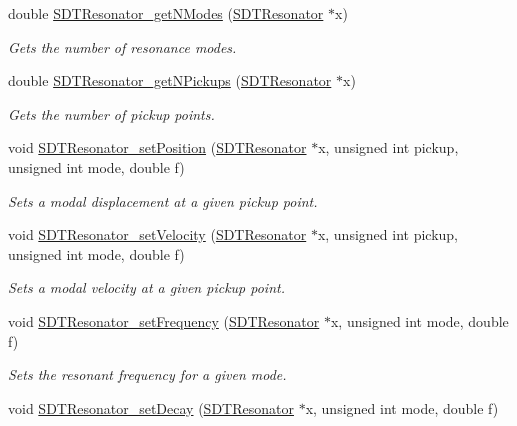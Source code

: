 \begin{DoxyCompactItemize}
double \hyperlink{group__resonators_gaf67b81e1a9672e525deca61fafd05c14}{S\+D\+T\+Resonator\+\_\+get\+N\+Modes} (\hyperlink{group__resonators_ga07d183de45e9713277c8f62d93d9be9c}{S\+D\+T\+Resonator} $\ast$x)
\begin{DoxyCompactList}\small\item\em Gets the number of resonance modes. \end{DoxyCompactList}\item 
double \hyperlink{group__resonators_ga15e4a46f0159847ab398fbd07724765d}{S\+D\+T\+Resonator\+\_\+get\+N\+Pickups} (\hyperlink{group__resonators_ga07d183de45e9713277c8f62d93d9be9c}{S\+D\+T\+Resonator} $\ast$x)
\begin{DoxyCompactList}\small\item\em Gets the number of pickup points. \end{DoxyCompactList}\item 
void \hyperlink{group__resonators_ga93dd7a7078a59411056c981f83bf608d}{S\+D\+T\+Resonator\+\_\+set\+Position} (\hyperlink{group__resonators_ga07d183de45e9713277c8f62d93d9be9c}{S\+D\+T\+Resonator} $\ast$x, unsigned int pickup, unsigned int mode, double f)
\begin{DoxyCompactList}\small\item\em Sets a modal displacement at a given pickup point. \end{DoxyCompactList}\item 
void \hyperlink{group__resonators_ga899d173cc4f8c5d35537fa0de2dc7c8e}{S\+D\+T\+Resonator\+\_\+set\+Velocity} (\hyperlink{group__resonators_ga07d183de45e9713277c8f62d93d9be9c}{S\+D\+T\+Resonator} $\ast$x, unsigned int pickup, unsigned int mode, double f)
\begin{DoxyCompactList}\small\item\em Sets a modal velocity at a given pickup point. \end{DoxyCompactList}\item 
void \hyperlink{group__resonators_gaf185ee761f1b70d09c6e276cabb2ddcd}{S\+D\+T\+Resonator\+\_\+set\+Frequency} (\hyperlink{group__resonators_ga07d183de45e9713277c8f62d93d9be9c}{S\+D\+T\+Resonator} $\ast$x, unsigned int mode, double f)
\begin{DoxyCompactList}\small\item\em Sets the resonant frequency for a given mode. \end{DoxyCompactList}\item 
void \hyperlink{group__resonators_gac293efb03ca211634197a7887c69a022}{S\+D\+T\+Resonator\+\_\+set\+Decay} (\hyperlink{group__resonators_ga07d183de45e9713277c8f62d93d9be9c}{S\+D\+T\+Resonator} $\ast$x, unsigned int mode, double f)

\end{DoxyCompactItemize}
